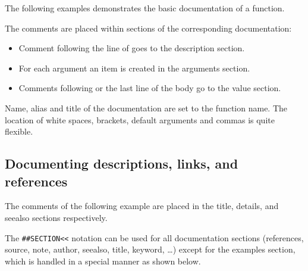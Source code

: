 \documentclass[article]{jss}
\begin{document}
The following examples demonstrates the basic documentation of a function.


The comments are placed within sections of the corresponding 
documentation:
\begin{itemize}
\item Comment following the line of  goes to the description
section.
\item For each argument an item is created in the arguments section.
\item Comments following  or the last line of the body go to the
value section.
\end{itemize} 

Name, alias and title of the documentation are set to the function name. The
location of white spaces, brackets, default arguments and commas is quite flexible.

\subsection{Documenting descriptions, links, and references}
The comments of the following example are placed in the title, details, and
seealso sections respectively.
 


The \verb+##SECTION<<+ notation can be used for all documentation
sections (references, source, note, author, seealso, title, keyword, \ldots)
except for the examples section, which is handled in a special manner as shown below.
\end{document}
